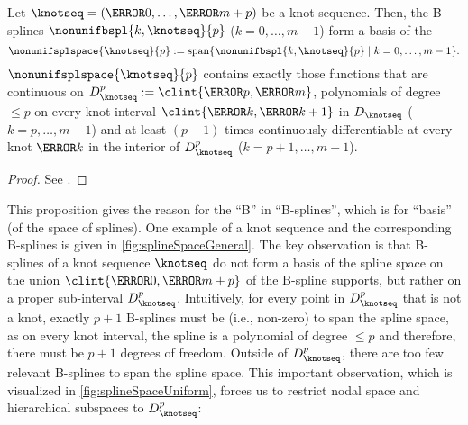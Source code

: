 \begin{proposition}
  \label{prop:splineSpace}
  Let $\knotseq = (\knot{0}, \dotsc, \knot{m+p})$ be a knot sequence.
  Then, the B-splines $\nonunifbspl{k,\knotseq}{p}$ ($k = 0, \dotsc, m - 1$)
  form a basis of the 
  \begin{equation}
    \nonunifsplspace{\knotseq}{p}
    := \spn\{\nonunifbspl{k,\knotseq}{p} \mid k = 0, \dotsc, m - 1\}.
  \end{equation}
  $\nonunifsplspace{\knotseq}{p}$ contains exactly those functions that are continuous
  on $D_\knotseq^p := \clint{\knot{p}, \knot{m}}$,
  polynomials of degree $\le p$ on every knot interval
  $\clint{\knot{k}, \knot{k+1}}$  in $D_\knotseq$
  ($k = p, \dotsc, m - 1$) and at least $(p - 1)$ times
  continuously differentiable at every knot $\knot{k}$ in the interior of
  $D_\knotseq^p$ ($k = p + 1, \dotsc, m - 1$).
\end{proposition}

\begin{proof}
  See \cite{Hoellig13Approximation}.
\end{proof}

This proposition gives the reason for the ``B'' in ``B-splines'',
which is for ``basis'' (of the space of splines).
One example of a knot sequence and the corresponding B-splines is
given in \cref{fig:splineSpaceGeneral}.
The key observation is that B-splines of a knot sequence $\knotseq$
do not form a basis of the spline space on the union
$\clint{\knot{0}, \knot{m+p}}$ of the B-spline supports,
but rather on a proper sub-interval $D_\knotseq^p$.
Intuitively, for every point in $D_\knotseq^p$ that is not a knot,
exactly $p + 1$ B-splines must be  (i.e., non-zero)
to span the spline space,
as on every knot interval, the spline is a polynomial of degree $\le p$
and therefore, there must be $p + 1$ degrees of freedom.
Outside of $D_\knotseq^p$, there are too few relevant B-splines
to span the spline space.
This important observation,
which is visualized in \cref{fig:splineSpaceUniform},
forces us to restrict nodal space and hierarchical subspaces to
$D_\knotseq^p$:

